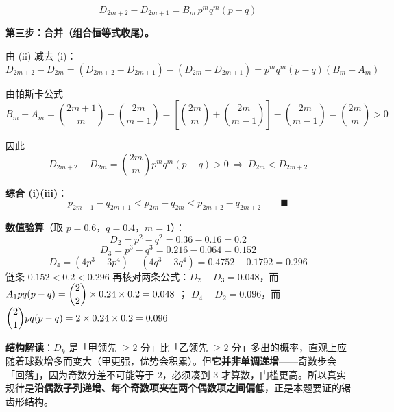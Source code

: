 \begin{answer}
\nopagebreak[4]
\[D_{2m+2}-D_{2m+1}=B_m\,p^mq^m(p-q)\tag{ii}\]

\par\medskip

\textbf{第三步：合并（组合恒等式收尾）。}

由 (ii) 减去 (i)：
\nopagebreak[4]
\[D_{2m+2}-D_{2m}=\left(D_{2m+2}-D_{2m+1}\right)-\left(D_{2m}-D_{2m+1}\right)=p^mq^m(p-q)\left(B_m-A_m\right)\]

由帕斯卡公式
\nopagebreak[4]
\[B_m-A_m=\binom{2m+1}{m}-\binom{2m}{m-1}=\left[\binom{2m}{m}+\binom{2m}{m-1}\right]-\binom{2m}{m-1}=\binom{2m}{m}>0\]

因此
\nopagebreak[4]
\[D_{2m+2}-D_{2m}=\binom{2m}{m}p^mq^m(p-q)>0\ \Longrightarrow\ \boxed{D_{2m}<D_{2m+2}}\tag{iii}\]

\textbf{综合 (i)(iii)}：
\nopagebreak[4]
\[p_{2m+1}-q_{2m+1}<p_{2m}-q_{2m}<p_{2m+2}-q_{2m+2}\qquad\blacksquare\]

\begin{gktip}
\textbf{数值验算}（取 $p=0.6$，$q=0.4$，$m=1$）：
\nopagebreak[4]
\[D_2=p^2-q^2=0.36-0.16=0.2\]
\nopagebreak[4]
\[D_3=p^3-q^3=0.216-0.064=0.152\]
\nopagebreak[4]
\[D_4=\left(4p^3-3p^4\right)-\left(4q^3-3q^4\right)=0.4752-0.1792=0.296\]
链条 $0.152<0.2<0.296$ 
再核对两条公式：$D_2-D_3=0.048$，而 $A_1p q(p-q)=\dbinom22\times0.24\times0.2=0.048$ ；
$D_4-D_2=0.096$，而 $\dbinom21pq(p-q)=2\times0.24\times0.2=0.096$ 

\textbf{结构解读}：$D_k$ 是「甲领先 $\ge2$ 分」比「乙领先 $\ge2$ 分」多出的概率，直观上应随着球数增多而变大（甲更强，优势会积累）。但\textbf{它并非单调递增}——奇数步会「回落」，因为奇数分差不可能等于 $2$，必须凑到 $3$ 才算数，门槛更高。所以真实规律是\textbf{沿偶数子列递增、每个奇数项夹在两个偶数项之间偏低}，正是本题要证的锯齿形结构。
\end{gktip}




\end{answer}